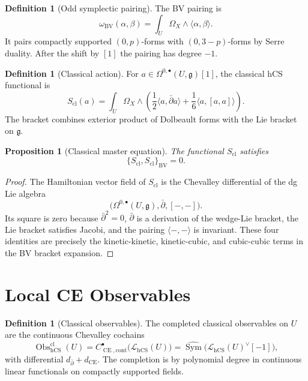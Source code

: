 \documentclass[11pt]{amsart}
\providecommand{\dbar}{\bar{\partial}}
\providecommand{\fg}{\mathfrak{g}}
\providecommand{\Sym}{\operatorname{Sym}}
\providecommand{\Obs}{\operatorname{Obs}}
\providecommand{\CE}{\operatorname{CE}}
\providecommand{\BV}{\operatorname{BV}}
\providecommand{\hCS}{\operatorname{hCS}}
\providecommand{\cL}{\mathcal{L}}
\theoremstyle{plain}
\newtheorem{proposition}[theorem]{Proposition}
\theoremstyle{definition}
\newtheorem{definition}[theorem]{Definition}
\theoremstyle{remark}
\begin{document}
\begin{definition}[Odd symplectic pairing]
\label{def:bv-pairing}
The BV pairing is
\[
  \omega_{\BV}(\alpha,\beta)
  =
  \int_U\Omega_X\wedge\langle\alpha,\beta\rangle .
\]
It pairs compactly supported \((0,p)\)-forms with \((0,3-p)\)-forms by
Serre duality. After the shift by \([1]\) the pairing has degree \(-1\).
\end{definition}

\begin{definition}[Classical action]
\label{def:classical-action}
For \(a\in\Omega^{0,\bullet}(U,\fg)[1]\), the classical hCS functional is
\[
  S_{\mathrm{cl}}(a)=
  \int_U\Omega_X\wedge
  \left(
    \frac12\langle a,\dbar a\rangle
    +\frac16\langle a,[a,a]\rangle
  \right).
\]
The bracket combines exterior product of Dolbeault forms with the Lie
bracket on \(\fg\).
\end{definition}

\begin{proposition}[Classical master equation]
\label{prop:cme}
The functional \(S_{\mathrm{cl}}\) satisfies
\[
  \{S_{\mathrm{cl}},S_{\mathrm{cl}}\}_{\BV}=0 .
\]
\end{proposition}

\begin{proof}
The Hamiltonian vector field of \(S_{\mathrm{cl}}\) is the Chevalley
differential of the dg Lie algebra
\[
  \bigl(\Omega^{0,\bullet}(U,\fg),\dbar,[-,-]\bigr).
\]
Its square is zero because \(\dbar^2=0\), \(\dbar\) is a derivation of
the wedge-Lie bracket, the Lie bracket satisfies Jacobi, and the pairing
\(\langle-,-\rangle\) is invariant. These four identities are precisely
the kinetic-kinetic, kinetic-cubic, and cubic-cubic terms in the BV
bracket expansion.
\end{proof}

\section{Local CE Observables}
\label{sec:local-ce-observables}

\begin{definition}[Classical observables]
\label{def:classical-observables}
The completed classical observables on \(U\) are the continuous
Chevalley cochains
\[
  \Obs^{\mathrm{cl}}_{\hCS}(U)
  =
  C^\bullet_{\CE,\mathrm{cont}}\bigl(\cL_{\hCS}(U)\bigr)
  =
  \widehat{\Sym}\bigl(\cL_{\hCS}(U)^\vee[-1]\bigr),
\]
with differential \(d_{\dbar}+d_{\CE}\). The completion is by polynomial
degree in continuous linear functionals on compactly supported fields.
\end{definition}
\end{document}
